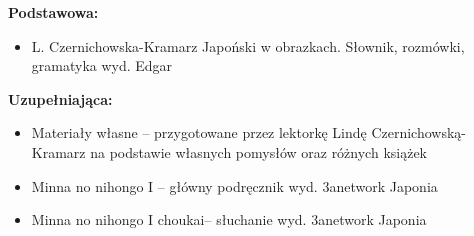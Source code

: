 \documentclass[12pt, a4paper]{article}
\begin{document}
\textbf{Podstawowa:}
\begin{itemize}
  \item L. Czernichowska-Kramarz Japoński w obrazkach. Słownik, rozmówki, gramatyka wyd. Edgar
\end{itemize}

\textbf{Uzupełniająca:}
\begin{itemize}
  \item Materiały własne – przygotowane przez lektorkę Lindę Czernichowską-Kramarz na podstawie własnych pomysłów oraz różnych książek
  \item Minna no nihongo I – główny podręcznik  wyd. 3anetwork Japonia
  \item Minna no nihongo I choukai– słuchanie  wyd. 3anetwork Japonia
\end{itemize}
\end{document}
